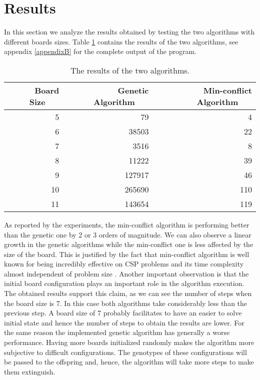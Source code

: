 \documentclass[runningheads]{llncs}
\begin{document}
\section{Results}
In this section we analyze the results obtained by testing the two
algorithms with different boards sizes. Table \ref{tab_nqueens}
contains the results of the two algorithms, see appendix
\ref{appendixB} for the complete output of the program.
\begin{table}
\caption{The results of the two algorithms.}\label{tab_nqueens}
\begin{tabular}{|r|r|r|}
\hline
\textbf{Board Size}~~~ & \textbf{Genetic Algorithm}~~~ &
\textbf{Min-conflict Algorithm}~~~ \\
\hline
5 & 79 & 4 \\
\hline
6 & 38503 & 22 \\
\hline
7 & 3516 & 8 \\
\hline
8 & 11222 & 39 \\
\hline
9 & 127917 & 46 \\
\hline
10 & 265690 & 110 \\
\hline
11 & 143654 & 119 \\
\hline
\end{tabular}
\end{table}
As reported by the experiments, the min-conflict algorithm is
performing better than the genetic one by 2 or 3 orders of
magnitude. We can also observe a linear growth in the genetic
algorithms while the min-conflict one is less affected by the size of
the board. This is justified by the fact that min-conflict algorithm
is well known for being incredibly effective on CSP problems and its
time complexity almost independent of problem size \cite{russel2016artificial}. Another important
observation is that the initial board configuration plays an important
role in the algorithm execution. The obtained results support this
claim, as we can see the number of steps when the board size is 7. In
this case both algorithms take considerably less than the previous
step. A board size of 7 probably facilitates to have an easier to
solve initial state and hence the number of steps to obtain the
results are lower. For the same reason the implemented genetic
algorithm has generally a worse performance. Having more boards initialized
randomly makes the algorithm more subjective to difficult
configurations. The genotypes of these configurations will be passed
to the offspring and, hence, the algorithm will take more steps to
make them extinguish.
\end{document}
